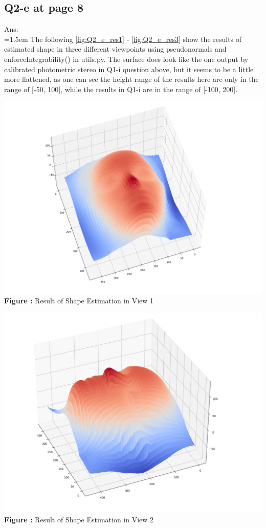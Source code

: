 \documentclass{article}
\begin{document}
	\newpage
	\subsection*{Q2-e at page 8}
	Ans:\\
	\hangindent=1.5em \hspace{1.5em}The following \autoref{fig:Q2_e_res1} - \autoref{fig:Q2_e_res3} show the results of estimated shape in three different viewpoints using pseudonormals and enforceIntegrability() in utils.py. The surface does look like the one output by calibrated photometric stereo in Q1-i question above, but it seems to be a little more flattened, as one can see the height range of the results here are only in the range of [-50, 100], while the results in Q1-i are in the range of [-100, 200].


	\begin{minipage}{1\linewidth}
	\centering
	\includegraphics[width=0.8\columnwidth, height=0.6\linewidth]{./Q2_e_res1.png}
	  \\%
	\textbf{Figure \thefigure:} Result of Shape Estimation in View 1  %
	\label{fig:Q2_e_res1}         %
	\end{minipage}

	\begin{minipage}{1\linewidth}
	\centering
	\includegraphics[width=0.8\columnwidth, height=0.6\linewidth]{./Q2_e_res2.png}
	  \\%
	\textbf{Figure \thefigure:} Result of Shape Estimation in View 2  %
	\label{fig:Q2_e_res2}         %
	\end{minipage}	
\end{document}
